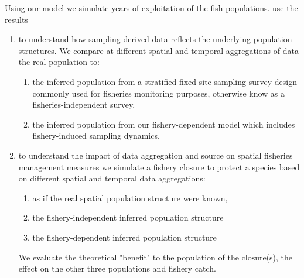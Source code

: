 \documentclass[review]{elsarticle}
\begin{document}
Using our model we simulate  years of exploitation of
the fish populations.  use the
results

\begin{enumerate}
	\item to understand how sampling-derived data reflects the underlying
		population structures. We compare at different spatial and
		temporal aggregations of data the real population to: 
		\begin{enumerate}
			\item the inferred population from a stratified fixed-site sampling survey design
				commonly used for fisheries monitoring purposes, otherwise know as a
				fisheries-independent survey,
			\item the inferred population from our fishery-dependent model which includes
				fishery-induced sampling dynamics.\\
		\end{enumerate}
	\item to understand the impact of data aggregation and source on
		spatial fisheries management measures we simulate a fishery closure to
		protect a species based on different spatial and temporal data
		aggregations:
		\begin{enumerate}
			\item as if the real spatial population structure were
				known,
			\item the fishery-independent inferred population
				structure
			\item the fishery-dependent inferred population
				structure
		\end{enumerate}
		We evaluate the theoretical "benefit" to the population of the
		closure(s), the effect on the other three populations and
		fishery catch.\\
\end{enumerate}
\end{document}
